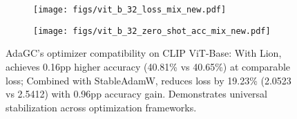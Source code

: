 \begin{figure}[!t]
    \centering
    \captionsetup{skip=2pt} %
    \begin{subfigure}{0.495\columnwidth}
        \texttt{[image: figs/vit\_b\_32\_loss\_mix\_new.pdf]}
        \vspace{-5mm} %
        \label{}
    \end{subfigure} \hfill
    \begin{subfigure}{0.495\columnwidth}
        \texttt{[image: figs/vit\_b\_32\_zero\_shot\_acc\_mix\_new.pdf]}
        \vspace{-5mm} %
        \label{}
    \end{subfigure}
    \caption{AdaGC's optimizer compatibility on CLIP ViT-Base: With Lion, achieves 0.16pp higher accuracy (40.81\% vs 40.65\%) at comparable loss; Combined with StableAdamW, reduces loss by 19.23\% (2.0523 vs 2.5412) with 0.96pp accuracy gain. Demonstrates universal stabilization across optimization frameworks.}
    \label{fig:openclip_vit_b_32_combine}
    \vspace{-2mm}
\end{figure}
